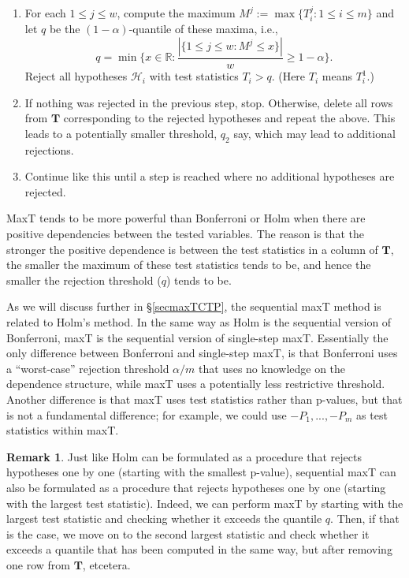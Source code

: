\documentclass[11pt]{article}
\theoremstyle{plain}
\theoremstyle{definition}
\newtheorem{remark}{Remark}[section]%
\newcommand{\reals}{\mathbb{R}}
\newcommand{\Hy}{\mathcal{H}}
\begin{document}
\begin{enumerate}
\item For each $1\leq j \leq w$, compute the maximum $M^j:=\max\{T_i^j: 1\leq i \leq m\}$ and let $q$ be the $(1-\alpha)$-quantile of these maxima, i.e., $$q= \min\{x\in \reals: \frac{|\{1\leq j \leq w: M^j\leq x \}|}{w}\geq 1-\alpha  \}.$$
Reject all hypotheses $\Hy_i$ with test statistics $T_i>q$. (Here $T_i$ means $T_i^1$.)
\item 
If nothing was rejected in the previous step, stop. Otherwise, delete all rows from $\bm{T}$ corresponding to the rejected hypotheses and repeat the above. This  leads to a potentially smaller threshold, $q_2$ say, which may lead to additional rejections.
\item 
Continue like this until a step is reached where no additional hypotheses are rejected.
\end{enumerate}


MaxT tends to be more powerful than Bonferroni or Holm when there are positive dependencies between the tested variables. The reason is that the stronger the positive dependence is between the test statistics in a column of $\bm{T}$, the smaller the maximum of these test statistics tends to be, and hence the smaller the rejection threshold ($q$) tends to be.

As we will discuss further in  \S\ref{secmaxTCTP}, the sequential maxT method is related to Holm's method. In the same way as Holm is the sequential version of Bonferroni, maxT is the sequential version of single-step maxT. Essentially the only difference between Bonferroni and single-step maxT, is that Bonferroni uses a ``worst-case'' rejection threshold $\alpha/m$ that uses no knowledge on the dependence structure, while maxT uses a potentially less restrictive threshold. Another difference is that maxT uses test statistics rather than p-values, but that is not a fundamental difference; for example, we could use $-P_1,...,-P_m$ as test statistics within maxT.

\begin{remark} \label{maxT1by1}
 Just like Holm can be formulated as a procedure that rejects hypotheses one by one (starting with the smallest p-value), sequential maxT can also be formulated as a procedure that rejects hypotheses one by one (starting with the largest test statistic). Indeed, we can perform maxT by starting with the largest test statistic and checking whether it exceeds the quantile $q$. Then, if that is the case, we move on to the second largest statistic and check whether it exceeds a quantile that has been computed in the same way, but after removing one row from $\bm{T}$, etcetera.
\end{remark}
\end{document}
